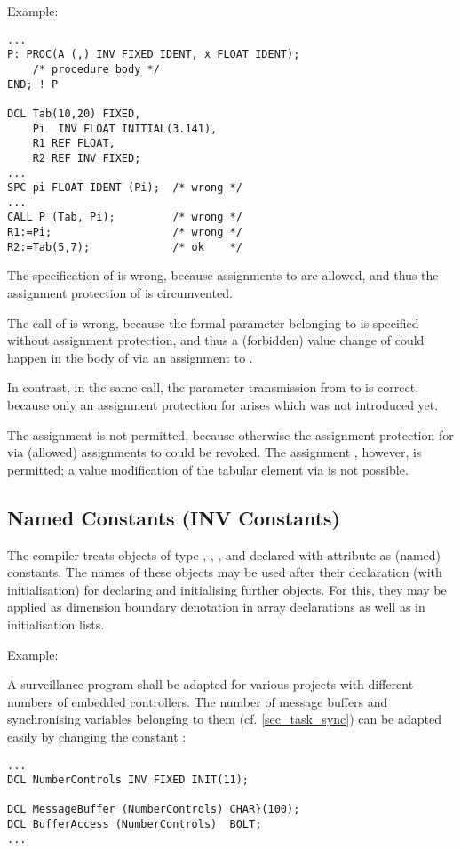 Example:

\begin{lstlisting}
...
P: PROC(A (,) INV FIXED IDENT, x FLOAT IDENT);
    /* procedure body */
END; ! P
 
DCL Tab(10,20) FIXED,
    Pi  INV FLOAT INITIAL(3.141),
    R1 REF FLOAT,
    R2 REF INV FIXED;
... 
SPC pi FLOAT IDENT (Pi);  /* wrong */ 
... 
CALL P (Tab, Pi);         /* wrong */ 
R1:=Pi;                   /* wrong */
R2:=Tab(5,7);             /* ok    */
\end{lstlisting}

The specification of  is wrong, because assignments to  are allowed,
and thus the assignment protection of  is circumvented.

The call of  is wrong, because the formal parameter  
belonging to 
is specified without assignment protection, and thus a (forbidden) value
change of  could happen in the body of  
via an assignment to .

In contrast, in the same call, the parameter transmission from 
 to 
is correct, because only an assignment protection for  arises which
was not introduced yet.

The assignment  is not permitted, because otherwise the assignment
protection for  via (allowed) assignments to 
 could be revoked.
The assignment , however, is permitted; a value modification
of the tabular element via  is not possible.

\subsection{Named Constants (INV Constants)}   %
\label{sec_named_const}

The compiler treats objects of type , ,
 ,  and
 declared with attribute 
 as (named) constants. The names of
these objects may be used after their declaration (with initialisation)
for declaring and initialising further objects. For this, they may be
applied as dimension boundary denotation in array declarations as well
as in initialisation lists.

\begin{minipage}{\linewidth}
Example:

A surveillance program shall be adapted for various projects with
different numbers of embedded controllers. The number of message
buffers and synchronising variables belonging to them 
(cf. \ref{sec_task_sync}) can be
adapted easily by changing the constant :

\begin{lstlisting}
...
DCL NumberControls INV FIXED INIT(11);

DCL MessageBuffer (NumberControls) CHAR}(100); 
DCL BufferAccess (NumberControls)  BOLT;
...
\end{lstlisting}
\end{minipage}

